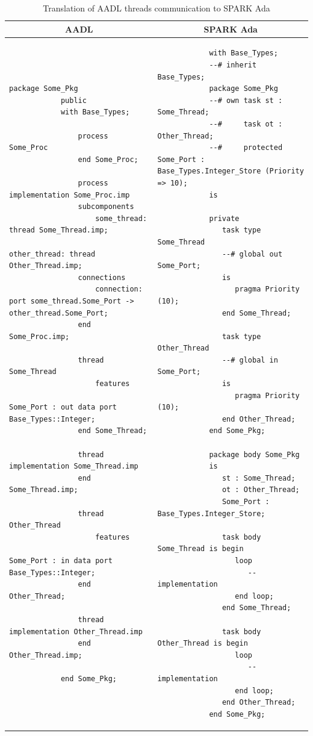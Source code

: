 \begin{table} %
	\caption{Translation of AADL threads communication to SPARK Ada}
	\label{table:port_communication_thread}
	\singlespacing
	\centering
  	\begin{tabular}{ | p{3in} | p{3in} |}

		\hline
		\multicolumn{1}{|c|}{\textbf{AADL}} & \multicolumn{1}{|c|}{\textbf{SPARK Ada}} \\ \hline

		\begin{lstlisting}[language=aadl]
			package Some_Pkg
			public
			with Base_Types;

				process Some_Proc
				end Some_Proc;
				
				process implementation Some_Proc.imp
				subcomponents
					some_thread: thread Some_Thread.imp;
					other_thread: thread Other_Thread.imp;
				connections
					connection: port some_thread.Some_Port -> other_thread.Some_Port;
				end Some_Proc.imp;

				thread Some_Thread
					features
						Some_Port : out data port Base_Types::Integer;
				end Some_Thread;

				thread implementation Some_Thread.imp
				end Some_Thread.imp;
				
				thread Other_Thread
					features
						Some_Port : in data port Base_Types::Integer;
				end Other_Thread;

				thread implementation Other_Thread.imp
				end Other_Thread.imp;
							
			end Some_Pkg;
		\end{lstlisting} 
		& 
		\begin{lstlisting}
			with Base_Types;
			--# inherit Base_Types;
			package Some_Pkg
			--# own task st : Some_Thread;
			--#     task ot : Other_Thread;
			--#     protected Some_Port : Base_Types.Integer_Store (Priority => 10);
			is
			   
			private   
			   task type Some_Thread     
			   --# global out Some_Port;   
			   is
			      pragma Priority (10);
			   end Some_Thread;
			   
			   task type Other_Thread
			   --# global in Some_Port;
			   is      
			      pragma Priority (10);      
			   end Other_Thread;	   
			end Some_Pkg;

			package body Some_Pkg
			is
			   st : Some_Thread;
			   ot : Other_Thread;
			   Some_Port : Base_Types.Integer_Store;

			   task body Some_Thread is begin      
			      loop         
			         -- implementation
			      end loop;      
			   end Some_Thread;
			   
			   task body Other_Thread is begin      
			      loop
			         -- implementation       
			      end loop;      
			   end Other_Thread;   
			end Some_Pkg;	
		\end{lstlisting} 		

		\\ \hline
	\end{tabular}
\end{table}
\doublespacing

